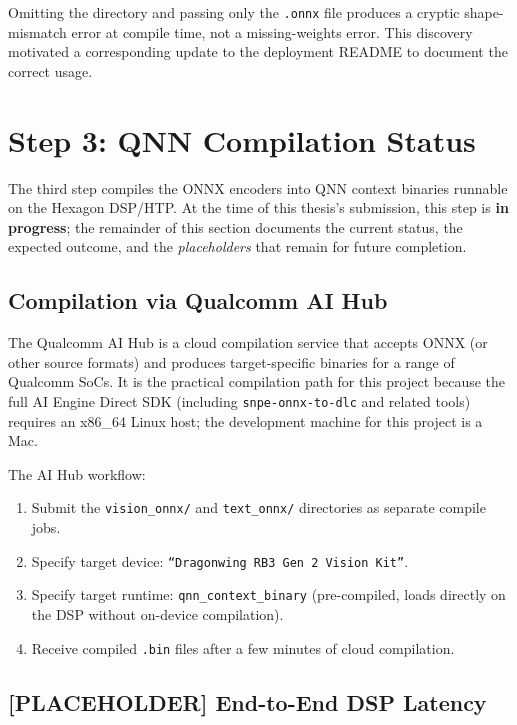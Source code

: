 \documentclass[../main.tex]{subfiles}
\begin{document}
\noindent Omitting the directory and passing only the \texttt{.onnx} file produces a cryptic shape-mismatch error at compile time, not a missing-weights error. This discovery motivated a corresponding update to the deployment README to document the correct usage.

\section{Step 3: QNN Compilation Status}
\label{sec:qnn_compilation}

\noindent The third step compiles the ONNX encoders into QNN context binaries runnable on the Hexagon DSP/HTP. At the time of this thesis's submission, this step is \textbf{in progress}; the remainder of this section documents the current status, the expected outcome, and the \textit{placeholders} that remain for future completion.

\subsection{Compilation via Qualcomm AI Hub}

\noindent The Qualcomm AI Hub is a cloud compilation service that accepts ONNX (or other source formats) and produces target-specific binaries for a range of Qualcomm SoCs. It is the practical compilation path for this project because the full AI Engine Direct SDK (including \texttt{snpe-onnx-to-dlc} and related tools) requires an x86\_64 Linux host; the development machine for this project is a Mac.

\noindent The AI Hub workflow:
\begin{enumerate}
    \item Submit the \texttt{vision\_onnx/} and \texttt{text\_onnx/} directories as separate compile jobs.
    \item Specify target device: \texttt{``Dragonwing RB3 Gen 2 Vision Kit''}.
    \item Specify target runtime: \texttt{qnn\_context\_binary} (pre-compiled, loads directly on the DSP without on-device compilation).
    \item Receive compiled \texttt{.bin} files after a few minutes of cloud compilation.
\end{enumerate}

\subsection{[PLACEHOLDER] End-to-End DSP Latency}
\end{document}
